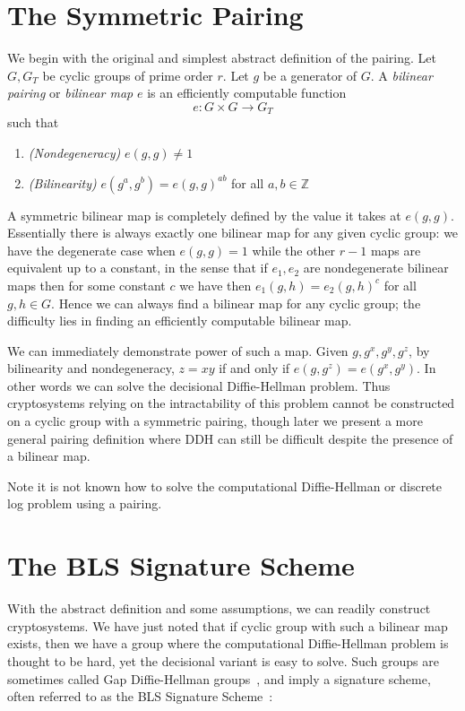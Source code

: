 \section{\label{sec:symmetricpairing}The Symmetric Pairing}

We begin with the original and simplest abstract definition of the pairing.
Let $G, G_T$ be cyclic groups of prime order $r$.
Let $g$ be a generator of $G$.
A \emph{bilinear pairing} or \emph{bilinear map}
$e$ is an efficiently computable function
\[
e:G \times G \rightarrow G_T
\]
such that
\begin{enumerate}
\item
\emph{(Nondegeneracy)}
$e(g,g) \ne 1$
\item
\emph{(Bilinearity)}
$e(g^a, g^b) = e(g,g)^{a b}$ for all $a, b \in \mathbb{Z}$
\end{enumerate}

A symmetric bilinear map is completely defined by the value it takes at
$e(g,g)$. Essentially there is always exactly one bilinear map for any given
cyclic group:
we have the degenerate case when $e(g,g)=1$
while the other $r-1$ maps are
equivalent up to a constant,
in the sense that if $e_1, e_2$ are nondegenerate bilinear maps then for
some constant $c$ we have
then $e_1(g,h) = e_2(g,h)^c$ for all $g,h \in G$.
Hence we can always find a bilinear map for any cyclic group;
the difficulty lies in finding an efficiently computable bilinear map.

We can immediately demonstrate power of such a map. Given
$g, g^x, g^y, g^z$, by bilinearity and nondegeneracy,
$z = x y$ if and only if
$e(g, g^z) = e(g^x, g^y)$. In other words we can solve the decisional
Diffie-Hellman problem. Thus cryptosystems relying on the intractability of
this problem cannot be constructed on a cyclic group with a symmetric pairing,
though later we present a more general pairing definition where DDH can still
be difficult despite the presence of a bilinear map.

Note it is not known how to solve the computational Diffie-Hellman
or discrete log problem using a pairing.

\section{The BLS Signature Scheme}

With the abstract definition and some assumptions, we can readily construct
cryptosystems. We have just noted that if cyclic group with such a bilinear map
exists, then we have a group where the computational Diffie-Hellman problem is
thought to be hard, yet the decisional variant is easy to solve. Such groups
are sometimes called Gap Diffie-Hellman groups~\cite{op}, and imply a signature
scheme, often referred to as the BLS Signature Scheme~\cite{bls}:

